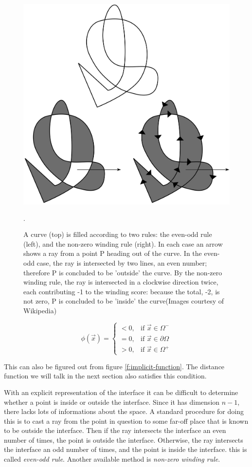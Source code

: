 \begin{figure}
\sidecaption
	\includegraphics[width=.65\textwidth]{graphics/df/Even-odd_and_non-zero_winding_fill_rules}
	\caption{A curve (top) is filled according to two rules: the even-odd rule (left), and the non-zero winding rule (right). In each case an arrow shows a ray from a point P heading out of the curve. In the even-odd case, the ray is intersected by two lines, an even number; therefore P is concluded to be 'outside' the curve. By the non-zero winding rule, the ray is intersected in a clockwise direction twice, each contributing -1 to the winding score: because the total, -2, is not zero, P is concluded to be 'inside' the curve(Images courtesy of Wikipedia)}.
\end{figure} 

\begin{equation*}
	\phi(\vec{x})=
	\begin{cases}
    <0,& \text{if } \vec{x}\in\Omega^-\\
    =0, & \text{if } \vec{x}\in\partial\Omega\\
    >0,&\text{if } \vec{x}\in\Omega^+
\end{cases}
\end{equation*}   

This can also be figured out from figure \ref{f:implicit-function}. The distance function we will talk in the next section also satisfies this condition.

With an explicit representation of the interface it can be difficult to determine whether a point is inside or outside the interface. Since it has dimension $n-1$, there lacks lots of informations about the space. A standard procedure for doing this is to cast a ray from the point in question to some far-off place that is known to be outside the interface. Then if the ray intersects the interface an even number of times, the point is outside the interface. Otherwise, the ray intersects the interface an odd number of times, and the point is inside the interface. this is called \textit{even-odd rule}. Another available method is \textit{non-zero winding rule}.


